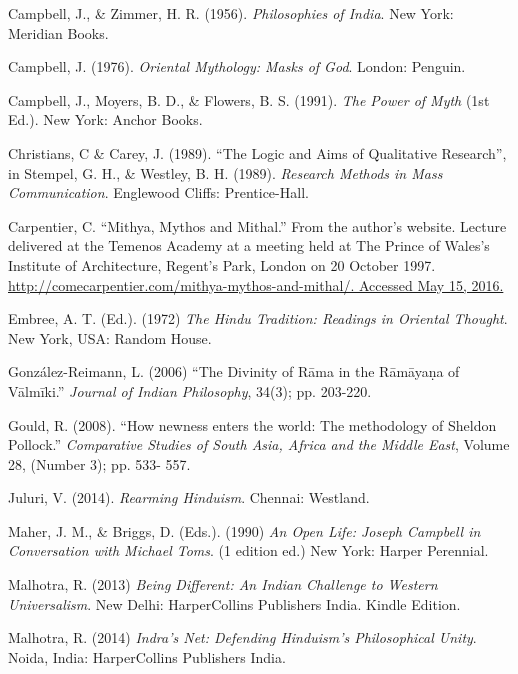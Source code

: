 \begin{thebibliography}{99}
 Campbell, J., \& Zimmer, H. R. (1956). \textit{Philosophies of India}. New York: Meridian Books.

  Campbell, J. (1976). \textit{Oriental Mythology: Masks of God}. London: Penguin.

  Campbell, J., Moyers, B. D., \& Flowers, B. S. (1991). \textit{The Power of Myth} (1st Ed.). New York: Anchor Books.

  Christians, C \& Carey, J. (1989). “The Logic and Aims of Qualitative Research”, in Stempel, G. H., \& Westley, B. H. (1989). \textit{Research Methods in Mass Communication}. Englewood Cliffs: Prentice-Hall.

  Carpentier, C. “Mithya, Mythos and Mithal.” From the author’s website. Lecture delivered at the Temenos Academy at a meeting held at The Prince of Wales's Institute of Architecture, Regent's Park, London on 20 October 1997. \url{http://comecarpentier.com/mithya-mythos-and-mithal/. Accessed May 15, 2016.}

  Embree, A. T. (Ed.). (1972) \textit{The Hindu Tradition: Readings in Oriental Thought}. New York, USA: Random House.

  González-Reimann, L. (2006) “The Divinity of Rāma in the Rāmāyaṇa of Vālmīki.” \textit{Journal of Indian Philosophy}, 34(3); pp. 203-220.

  Gould, R. (2008). “How newness enters the world: The methodology of Sheldon Pollock.” \textit{Comparative Studies of South Asia, Africa and the Middle East}, Volume 28, (Number 3); pp. 533- 557.

  Juluri, V. (2014). \textit{Rearming Hinduism}. Chennai: Westland.

  Maher, J. M., \& Briggs, D. (Eds.). (1990) \textit{An Open Life: Joseph Campbell in Conversation with Michael Toms}. (1 edition ed.) New York: Harper Perennial.

  Malhotra, R. (2013) \textit{Being Different: An Indian Challenge to Western Universalism}. New Delhi: HarperCollins Publishers India. Kindle Edition.

  Malhotra, R. (2014) \textit{Indra’s Net: Defending Hinduism’s Philosophical Unity}. Noida, India: HarperCollins Publishers India.


\end{thebibliography}

